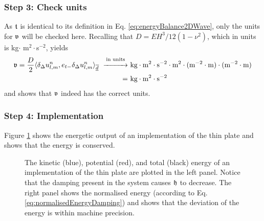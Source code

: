 {\subsubsection{Step 3: Check units}
As $\mathfrak{t}$ is identical to its definition in Eq. \eqref{eq:energyBalance2DWave}, only the units for $\mathfrak{v}$ will be checked here. Recalling that $D = EH^3 / 12(1-\nu^2)$, which in units is kg$\cdot$ m$^2\cdot$s$^{-2}$, yields
\begin{align*}
    \mathfrak{v} = \frac{D}{2}\langle\delta_{\Delta} u_{l,m}^n, e_{t-}\delta_{\Delta} u_{l,m}^n\rangle_{\overline{\underline{d}}} \
    \overset{\text{in units}}{\xrightarrow{\hspace*{1cm}}} \ & \text{kg} \cdot \text{m}^2\cdot\text{s}^{-2}\cdot\text{m}^2\cdot(\text{m}^{-2}\cdot\text{m})\cdot(\text{m}^{-2}\cdot\text{m})\nonumber \\
    = \ &\text{kg}\cdot\text{m}^2\cdot\text{s}^{-2}
\end{align*}
and shows that $\mathfrak{v}$ indeed has the correct units. 

\subsubsection{Step 4: Implementation}
Figure \ref{fig:energyThinPlate} shows the energetic output of an implementation of the thin plate and shows that the energy is conserved.
\begin{figure}[h]
    \centering
      \caption{The kinetic (blue), potential (red), and total (black) energy of an implementation of the thin plate are plotted in the left panel. Notice that the damping present in the system causes $\mathfrak{h}$ to decrease. The right panel shows the normalised energy (according to Eq. \eqref{eq:normalisedEnergyDamping}) and shows that the deviation of the energy is within machine precision. \label{fig:energyThinPlate}}
\end{figure}

}
